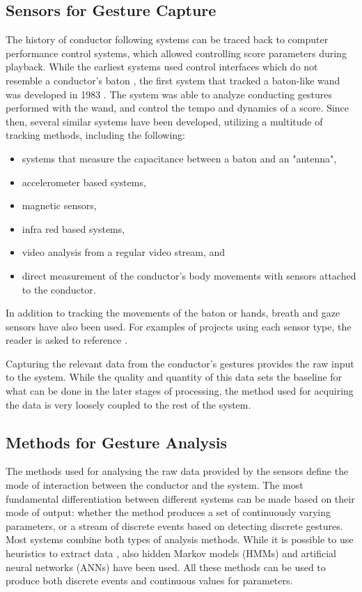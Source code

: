 \subsection{Sensors for Gesture Capture}

The history of conductor following systems
can be traced back to computer performance control systems,
which allowed controlling score parameters during playback.
While the earliest systems
used control interfaces which do not resemble a conductor's baton \cite{Buxton1980},
the first system that tracked a baton-like wand
was developed in 1983 \cite{Haflich1983}.
The system was able to analyze conducting gestures performed with the wand,
and control the tempo and dynamics of a score.
Since then, several similar systems have been developed,
utilizing a multitude of tracking methods,
including the following:
\begin{itemize}
\item systems that measure the capacitance between a baton and an "antenna",
\item accelerometer based systems,
\item magnetic sensors,
\item infra red based systems,
\item video analysis from a regular video stream, and
\item direct measurement of the conductor's body movements with
sensors attached to the conductor.
\end{itemize}
In addition to tracking the movements of the baton or hands,
breath and gaze sensors have also been used.
For examples of projects using each sensor type,
the reader is asked to reference \cite{Fabiani2012}.

Capturing the relevant data from the conductor's gestures
provides the raw input to the system.
While the quality and quantity of this data
sets the baseline for what can be done
in the later stages of processing,
the method used for acquiring the data
is very loosely coupled to the rest of the system.

\subsection{Methods for Gesture Analysis}

The methods used for analysing the raw data
provided by the sensors define the
mode of interaction between the conductor and the system.
The most fundamental differentiation between different systems
can be made based on their mode of output:
whether the method produces
a set of continuously varying parameters,
or a stream of discrete events based on detecting discrete gestures.
Most systems combine both types of analysis methods.
While it is possible to use
heuristics to extract data \cite{Ilmonen1999, Morita1991},
also hidden Markov models (HMMs) \cite{Usa1998, Kolesnik2004, Lee2006} and
artificial neural networks (ANNs) \cite{Ilmonen1999, Bruegge2007}
have been used.
All these methods can be used to produce both discrete events
and continuous values for parameters.

